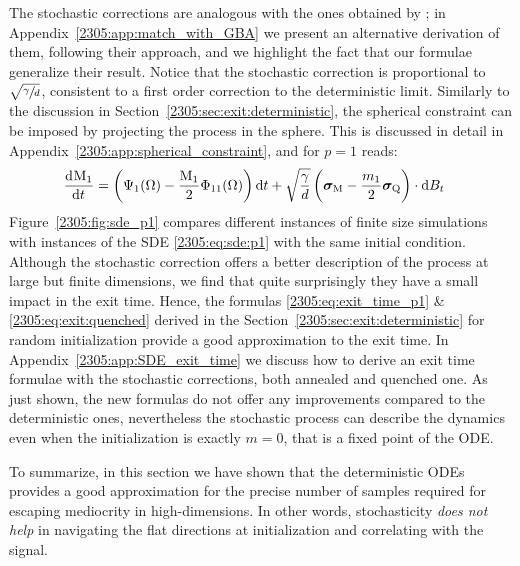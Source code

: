 The stochastic corrections are analogous with the ones obtained by \cite{arous2022high}; in Appendix~\ref{2305:app:match_with_GBA} we present an alternative derivation of them, following their approach, and we highlight the fact that our formulae generalize their result.
Notice that the stochastic correction is proportional to \(\sqrt{\sfrac{\gamma}{d}}\), consistent to a first order correction to the deterministic limit. Similarly to the discussion in Section~\ref{2305:sec:exit:deterministic}, the spherical constraint can be imposed by projecting the process in the sphere. This is discussed in detail in Appendix~\ref{2305:app:spherical_constraint}, and for $p=1$ reads:
\begin{equation}
\label{2305:eq:sde:p1}
\begin{split}
 \dod{\M_1}{t} &= \left(\Psi_{1}{(\Omega)} - \frac{\M_{1}}{2}\Phi_{11}{(\Omega)}\right)\dif t + \sqrt{\frac{\gamma}{d}}   \left(\vec{\sigma}_\M-\frac{m_1}{2}\vec{\sigma}_\Q\right)\cdot\dif\b_t 
\end{split}
\end{equation}
Figure~\ref{2305:fig:sde_p1} compares different instances of finite size simulations with instances of the SDE \eqref{2305:eq:sde:p1} with the same initial condition. Although the stochastic correction offers a better description of the process at large but finite dimensions, we find that quite surprisingly they have a small impact in the exit time. Hence, the formulas \eqref{2305:eq:exit_time_p1} \& \eqref{2305:eq:exit:quenched} derived in the Section~\ref{2305:sec:exit:deterministic} for random initialization provide a good approximation to the exit time. In Appendix~\ref{2305:app:SDE_exit_time} we discuss how to derive an exit time formulae with the stochastic corrections, both annealed and quenched one. As just shown, the new formulas do not offer any improvements compared to the deterministic ones, nevertheless the stochastic process can describe the dynamics even when the initialization is exactly \(m=0\), that is a fixed point of the ODE.

To summarize, in this section we have shown that the deterministic ODEs provides a good approximation for the precise number of samples required for escaping mediocrity in high-dimensions. In other words, stochasticity \emph{does not help} in navigating the flat directions at initialization and correlating with the signal.
